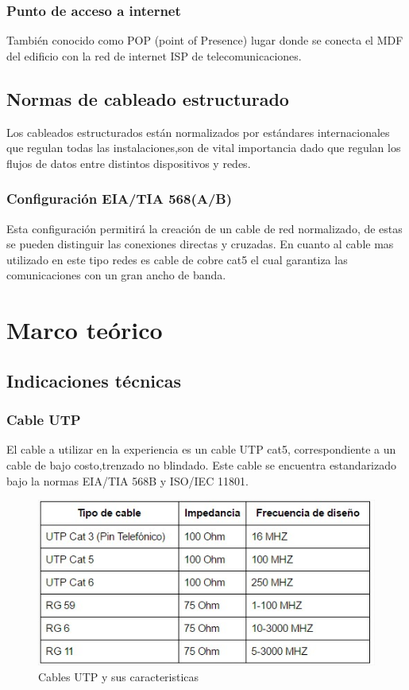 \documentclass[spanish]{udpreport}
\begin{document}
\subsection{Punto de acceso a internet}
También conocido como POP (point of Presence) lugar donde se conecta el MDF del edificio con la red de internet ISP de telecomunicaciones.
\section{Normas de cableado estructurado}
Los cableados estructurados están normalizados por estándares internacionales que regulan todas las instalaciones,son de vital importancia dado que regulan los flujos de datos entre distintos dispositivos y redes.
\subsection{Configuración EIA/TIA 568(A/B)}
Esta configuración permitirá la creación de  un cable de red normalizado, de estas se pueden distinguir las conexiones directas y cruzadas.
En cuanto al cable mas utilizado en este tipo redes es cable de cobre cat5 el cual garantiza las comunicaciones con un gran ancho de banda.
\chapter{Marco teórico}
\section{Indicaciones técnicas}
\subsection{Cable UTP}
El cable a utilizar en la experiencia es un cable UTP cat5, correspondiente a un cable de bajo costo,trenzado no blindado. Este cable se encuentra estandarizado bajo la normas EIA/TIA 568B y ISO/IEC 11801.
\begin{figure}[h]
    \centering
    \includegraphics[scale=0.3]{images/FrecuenciaCable.jpg}
    \caption{Cables UTP y sus caracteristicas}
    \label{fig:my_label}
\end{figure}
\end{document}
